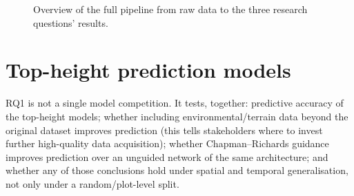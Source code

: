 \documentclass[11pt,a4paper]{report}
\begin{document}
%
%
\begin{figure}[!htbp]
\centering
{}
\caption{Overview of the full pipeline from raw data to the three research questions' results.}
\label{fig:pipeline-overview}
\end{figure}

\section{Top-height prediction models}

RQ1 is not a single model competition. It tests, together: predictive accuracy of the
top-height models; whether including environmental/terrain data beyond the original dataset
improves prediction (this tells stakeholders where to invest further high-quality data
acquisition); whether Chapman--Richards guidance improves prediction over an unguided network of
the same architecture; and whether any of those conclusions hold under spatial and temporal
generalisation, not only under a random/plot-level split.
\end{document}
